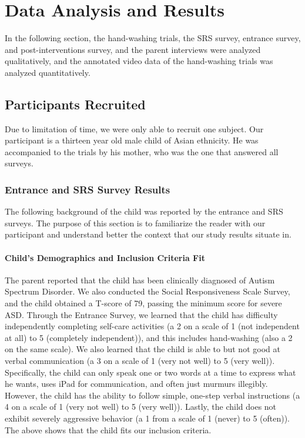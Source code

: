\section{Data Analysis and Results}
In the following section, the hand-washing trials, the SRS survey, entrance survey, and post-interventions survey, and the parent interviews were analyzed qualitatively, and the annotated video data of the hand-washing trials was analyzed quantitatively.

\subsection{Participants Recruited}
Due to limitation of time, we were only able to recruit one subject.  Our participant is a thirteen year old male child of Asian ethnicity.  He was accompanied to the trials by his mother, who was the one that answered all surveys.

\subsubsection{Entrance and SRS Survey Results}
The following background of the child was reported by the entrance and SRS surveys.  The purpose of this section is to familiarize the reader with our participant and understand better the context that our study results situate in.

\paragraph{Child's Demographics and Inclusion Criteria Fit}
The parent reported that the child has been clinically diagnosed of Autism Spectrum Disorder.  We also conducted the Social Responsiveness Scale Survey, and the child obtained a T-score of 79, passing the minimum score for severe ASD.  Through the Entrance Survey, we learned that the child has difficulty independently completing self-care activities (a 2 on a scale of 1 (not independent at all) to 5 (completely independent)), and this includes hand-washing (also a 2 on the same scale).  We also learned that the child is able to but not good at verbal communication (a 3 on a scale of 1 (very not well) to 5 (very well)).  Specifically, the child can only speak one or two words at a time to express what he wants, uses iPad for communication, and often just murmurs illegibly.  However, the child has the ability to follow simple, one-step verbal instructions (a 4 on a scale of 1 (very not well) to 5 (very well)).  Lastly, the child does not exhibit severely aggressive behavior (a 1 from a scale of 1 (never) to 5 (often)).  The above shows that the child fits our inclusion criteria.

